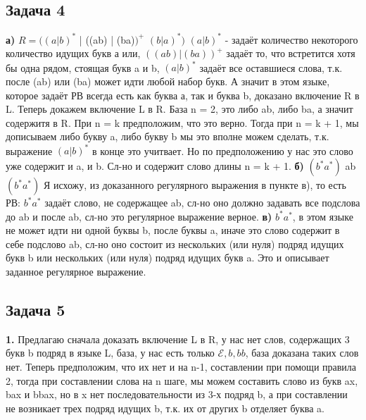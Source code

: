 \documentclass[a4paper,14pt]{article} %
\begin{document}
\subsection{Задача 4}
\textbf{а)} $R = ((a|b)^{*}$ | ((ab) | (ba)$)^{+}$ $(b|a)^{*})$
$(a|b)^{*}$ - задаёт количество некоторого количество идущих букв а или,
$((ab) | (ba))^{+}$ задаёт то, что встретится хотя бы одна рядом, стоящая букв a и b,
$(a|b)^{*}$ задаёт все оставшиеся слова, т.к. после (ab) или (ba) может идти любой набор букв.
А значит в этом языке, которое задаёт РВ всегда есть как буква а, так и буква b, доказано включение R в L.
\newline
Теперь докажем включение L в R.
База n = 2, это либо ab, либо ba, а значит содержитя в R.
При n = k предположим, что это верно. Тогда при n = k + 1, мы дописываем либо букву a, либо букву b мы это вполне можем сделать, т.к. выражение $(a|b)^{*}$ в конце это учитвает.
Но по предположению у нас это слово уже содержит и a, и b. Сл-но и содержит слово длины n = k + 1.
\newline
\textbf{б)} $(b^{*}a^{*})$ ab $(b^{*}a^{*})$ Я исхожу, из доказанного регулярного выражения в пункте в), то есть РВ: $b^{*}a^{*}$ задаёт слово, не содержащее ab, сл-но оно должно задавать все подслова до ab и после ab, сл-но это регулярное выражение верное.
\newline
\textbf{в)} $b^{*}a^{*}$, в этом языке не может идти ни одной буквы b, после буквы a, иначе это слово содержит в себе подслово ab, сл-но оно состоит из нескольких (или нуля) подряд идущих букв b или нескольких (или нуля) подряд идущих букв a.
Это и описывает заданное регулярное выражение.
\newline
\subsection{Задача 5}
\textbf{1.} Предлагаю сначала доказать включение L в R, у нас нет слов, содержащих 3 букв b подряд в языке L, база, у нас есть только $\mathcal{E}, b, bb$, база доказана таких слов нет.
Теперь предположим, что их нет и на n-1, составлении при помощи правила 2, тогда при составлении слова на n шаге, мы можем составить слово из букв ax, bax и bbax, но в x нет последовательности 
из 3-х подряд b, а при составлении не возникает трех подряд идущих b, т.к. их от других b отделяет буква a. 
\end{document}
